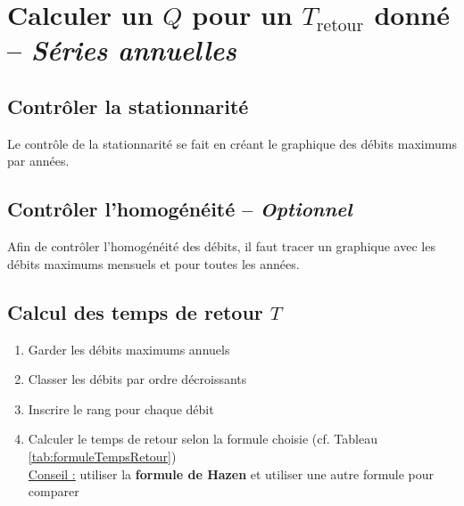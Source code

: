 \chapter{Calculer un $Q$ pour un $T_\text{retour}$ donné -- \textit{Séries annuelles}}



\section{Contrôler la stationnarité} \label{sec:controleStationnarite}
Le contrôle de la stationnarité se fait en créant le graphique des débits maximums par années. \\


\section{Contrôler l'homogénéité -- \textit{Optionnel}}
Afin de contrôler l'homogénéité des débits, il faut tracer un graphique avec les débits maximums mensuels et pour toutes les années. \\


\section{Calcul des temps de retour $T$} \label{sec:calculTempsRetour}
\begin{enumerate}
    \item Garder les débits maximums annuels
    \item Classer les débits par ordre décroissants
    \item Inscrire le rang pour chaque débit
    \item Calculer le temps de retour selon la formule choisie (cf. Tableau \ref{tab:formuleTempsRetour}) \\
    \underline{Conseil :} utiliser la \textbf{{\color{red} formule de Hazen}} et utiliser une autre formule pour comparer
\end{enumerate}



